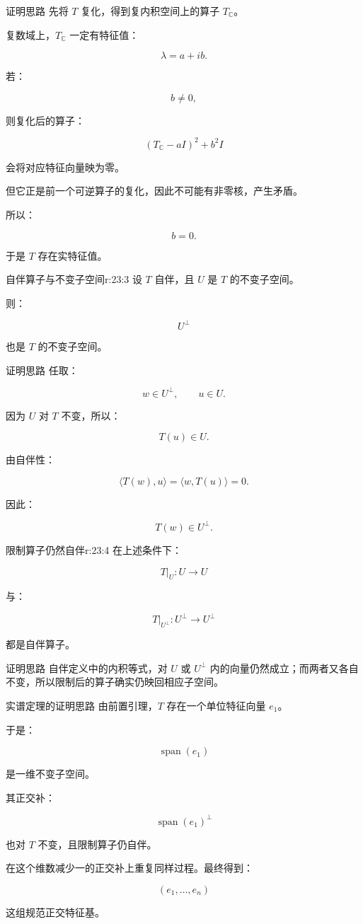 \begin{jproof}{证明思路}
先将 $T$ 复化，得到复内积空间上的算子 $T_{\mathbb C}$。

复数域上，$T_{\mathbb C}$ 一定有特征值：

\[
\lambda=a+ib.
\]

若：

\[
b\ne0,
\]

则复化后的算子：

\[
(T_{\mathbb C}-aI)^2+b^2I
\]

会将对应特征向量映为零。

但它正是前一个可逆算子的复化，因此不可能有非零核，产生矛盾。

所以：

\[
b=0.
\]

于是 $T$ 存在实特征值。
\end{jproof}

\begin{jprop}{自伴算子与不变子空间}{r:23:3}
设 $T$ 自伴，且 $U$ 是 $T$ 的不变子空间。

则：

\[
U^\perp
\]

也是 $T$ 的不变子空间。
\end{jprop}

\begin{jproof}{证明思路}
任取：

\[
w\in U^\perp,
\qquad
u\in U.
\]

因为 $U$ 对 $T$ 不变，所以：

\[
T(u)\in U.
\]

由自伴性：

\[
\langle T(w),u\rangle
=
\langle w,T(u)\rangle
=
0.
\]

因此：

\[
T(w)\in U^\perp.
\]
\end{jproof}

\begin{jprop}{限制算子仍然自伴}{r:23:4}
在上述条件下：

\[
T|_U:U\to U
\]

与：

\[
T|_{U^\perp}:U^\perp\to U^\perp
\]

都是自伴算子。
\end{jprop}

\begin{jproof}{证明思路}
自伴定义中的内积等式，对 $U$ 或 $U^\perp$ 内的向量仍然成立；而两者又各自不变，所以限制后的算子确实仍映回相应子空间。
\end{jproof}

\begin{jproof}{实谱定理的证明思路}
由前置引理，$T$ 存在一个单位特征向量 $e_1$。

于是：

\[
\operatorname{span}(e_1)
\]

是一维不变子空间。

其正交补：

\[
\operatorname{span}(e_1)^\perp
\]

也对 $T$ 不变，且限制算子仍自伴。

在这个维数减少一的正交补上重复同样过程。最终得到：

\[
(e_1,\ldots,e_n)
\]

这组规范正交特征基。
\end{jproof}
